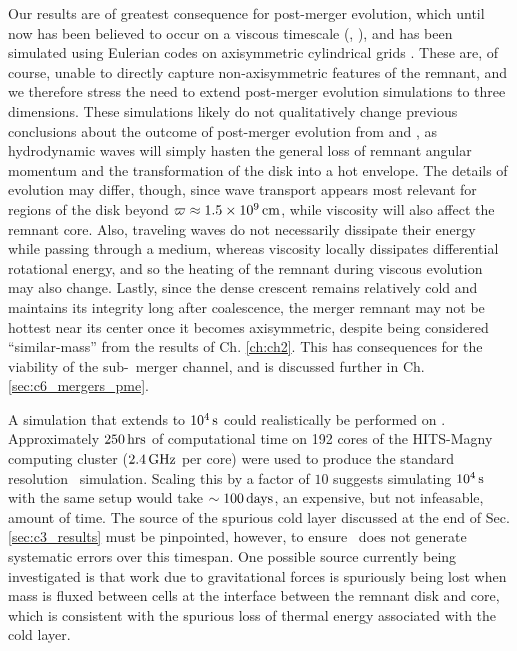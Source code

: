 Our results are of greatest consequence for post-merger evolution, which until now has been believed to occur on a viscous timescale (\citeal{vkercj10}, \citealt{shen+12}), and has been simulated using Eulerian codes on axisymmetric cylindrical grids \citep{schw+12,ji+13}.  These are, of course, unable to directly capture non-axisymmetric features of the remnant, and we therefore stress the need to extend post-merger evolution simulations to three dimensions.  These simulations likely do not qualitatively change previous conclusions about the outcome of post-merger evolution from \cite{schw+12} and \cite{ji+13}, as hydrodynamic waves will simply hasten the general loss of remnant angular momentum and the transformation of the disk into a hot envelope.  The details of evolution may differ, though, since wave transport appears most relevant for regions of the disk beyond $\varpi \approx 1.5\times10^9\,\mathrm{cm}$, while viscosity will also affect the remnant core.  Also, traveling waves do not necessarily dissipate their energy while passing through a medium, whereas viscosity locally dissipates differential rotational energy, and so the heating of the remnant during viscous evolution may also change.  Lastly, since the dense crescent remains relatively cold and maintains its integrity long after coalescence, the merger remnant may not be hottest near its center once it becomes axisymmetric, despite being considered ``similar-mass'' from the results of Ch. \ref{ch:ch2}.  This has consequences for the viability of the sub-\Mch\ merger channel, and is discussed further in Ch. \ref{sec:c6_mergers_pme}.

A simulation that extends to $10^4\,\mathrm{s}$ could realistically be performed on \arepo.  Approximately $250\,\mathrm{hrs}$ of computational time on 192 cores of the HITS-Magny computing cluster ($2.4\,\mathrm{GHz}$ per core) were used to produce the standard resolution \arepo\ simulation.  Scaling this by a factor of $10$ suggests simulating $10^4\,\mathrm{s}$ with the same setup would take $\sim100\,\mathrm{days}$, an expensive, but not infeasable, amount of time.  The source of the spurious cold layer discussed at the end of Sec. \ref{sec:c3_results} must be pinpointed, however, to ensure \arepo\ does not generate systematic errors over this timespan.  One possible source currently being investigated is that work due to gravitational forces is spuriously being lost when mass is fluxed between cells at the interface between the remnant disk and core, which is consistent with the spurious loss of thermal energy associated with the cold layer.

